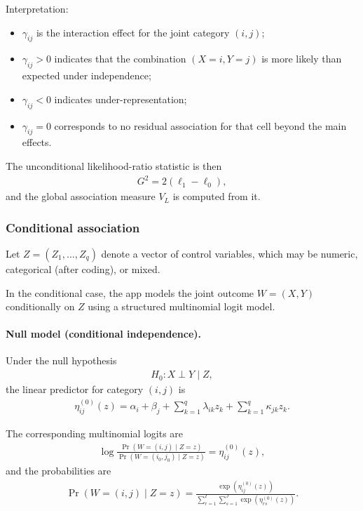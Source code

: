 \documentclass[11pt,a4paper]{article}
\begin{document}
Interpretation:
\begin{itemize}
\item $\gamma_{ij}$ is the interaction effect for the joint category $(i,j)$;
\item $\gamma_{ij} > 0$ indicates that the combination $(X=i,Y=j)$ is more likely than expected under independence;
\item $\gamma_{ij} < 0$ indicates under-representation;
\item $\gamma_{ij} = 0$ corresponds to no residual association for that cell beyond the main effects.
\end{itemize}

The unconditional likelihood-ratio statistic is then
\begin{align}
G^2 = 2(\ell_1 - \ell_0),
\end{align}
and the global association measure $V_L$ is computed from it.

\subsubsection*{Conditional association}

Let $Z = (Z_1,\dots,Z_q)$ denote a vector of control variables, which may be numeric, categorical (after coding), or mixed.

In the conditional case, the app models the joint outcome $W=(X,Y)$ conditionally on $Z$ using a structured multinomial logit model.

\paragraph{Null model (conditional independence).}

Under the null hypothesis
\begin{align}
H_0: X \perp Y \mid Z,
\end{align}
the linear predictor for category $(i,j)$ is
\begin{align}
\eta^{(0)}_{ij}(z)
=
\alpha_i + \beta_j
+ \sum_{k=1}^q \lambda_{ik} z_k
+ \sum_{k=1}^q \kappa_{jk} z_k.
\end{align}

The corresponding multinomial logits are
\begin{align}
\log\frac{\Pr(W=(i,j)\mid Z=z)}{\Pr(W=(i_0,j_0)\mid Z=z)}
=
\eta^{(0)}_{ij}(z),
\end{align}
and the probabilities are
\begin{align}
\Pr(W=(i,j)\mid Z=z)
=
\frac{\exp\!\left(\eta^{(0)}_{ij}(z)\right)}
{\sum_{r=1}^I \sum_{s=1}^J \exp\!\left(\eta^{(0)}_{rs}(z)\right)}.
\end{align}
\end{document}
